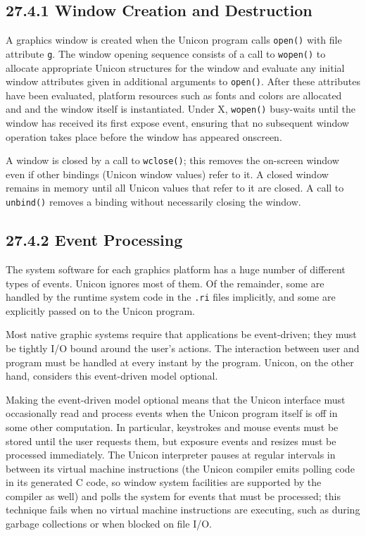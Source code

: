 \subsection[27.4.1 Window Creation and Destruction]{27.4.1 Window Creation and Destruction}

A graphics window is created when the Unicon program calls
\texttt{open()} with file attribute
\texttt{{\textquotedbl}g{\textquotedbl}}. The window opening sequence
consists of a call to \texttt{wopen()} to allocate appropriate Unicon
structures for the window and evaluate any initial window attributes
given in additional arguments to \texttt{open()}. After these
attributes have been evaluated, platform resources such as fonts and
colors are allocated and and the window itself is instantiated. Under
X, \texttt{wopen()} busy-waits until the window has received its first
expose event, ensuring that no subsequent window operation takes place
before the window has appeared onscreen.

A window is closed by a call to \texttt{wclose()}; this removes the
on-screen window even if other bindings (Unicon window values) refer
to it. A closed window remains in memory until all Unicon values that
refer to it are closed. A call to \texttt{unbind()} removes a binding
without necessarily closing the window.

\subsection[27.4.2 Event Processing]{27.4.2 Event Processing}

The system software for each graphics platform has a huge number of
different types of events. Unicon ignores most of them. Of the
remainder, some are handled by the runtime system code in the
\texttt{.ri} files implicitly, and some are explicitly passed on to
the Unicon program.

Most native graphic systems require that applications be event-driven;
they must be tightly I/O bound around the user's actions. The
interaction between user and program must be handled at every instant
by the program. Unicon, on the other hand, considers this event-driven
model optional.


Making the event-driven model optional means that the Unicon interface
must occasionally read and process events when the Unicon program
itself is off in some other computation. In particular, keystrokes and
mouse events must be stored until the user requests them, but exposure
events and resizes must be processed immediately. The Unicon
interpreter pauses at regular intervals in between its virtual machine
instructions (the Unicon compiler emits polling code in its generated
C code, so window system facilities are supported by the compiler as
well) and polls the system for events that must be processed; this
technique fails when no virtual machine instructions are executing,
such as during garbage collections or when blocked on file I/O.

